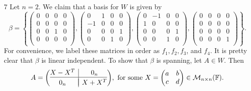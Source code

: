 \documentclass{article}
\makeatletter
\newenvironment{amatrix}[1]{%
  \left(\begin{array}{@{}*{#1}{c}|c@{}}
}{%
  \end{array}\right)
}
\theoremstyle{plain} %
\numberwithin{thm}{section} %
\theoremstyle{definition}
\makeatother
\begin{document}
\begin{question}{7}
        Let \(n = 2\). We claim that a basis for \(W\) is given by
        \[
            \beta = \left\{ \begin{pmatrix}
                0 & 0 & 0 &  0 \\
                0 & 0 & 0 &  0 \\
                0 & 0 & 1 &  0 \\
                0 & 0 & 0 &  0 \\
            \end{pmatrix},
            \begin{pmatrix}
                0 & 1 & 0 &  0 \\
                -1 & 0 & 0 &  0 \\
                0 & 0 & 0 &  1 \\
                0 & 0 & 1 &  0 \\
            \end{pmatrix},
            \begin{pmatrix}
                0 & -1 & 0 &  0 \\
                1 & 0 & 0 &  0 \\
                0 & 0 & 0 &  1 \\
                0 & 0 & 1 &  0 \\
            \end{pmatrix},
            \begin{pmatrix}
                0 & 0 & 0 &  0 \\
                0 & 0 & 0 &  0 \\
                0 & 0 & 0 &  0 \\
                0 & 0 & 0 &  1 \\
            \end{pmatrix}\right\}.
        \]
        For convenience, we label these matrices in order as \(f_1, f_2, f_3\), and \(f_4\). It is pretty clear that \(\beta\) is linear independent. To show that \(\beta\) is spanning, let \(A \in W\). Then
        \[
            A = \begin{amatrix}{1}
                X - X^T & 0_n \\
                \hline \\[-10pt]
                0_n & X + X^T
            \end{amatrix}, \text{ for some } X = \begin{pmatrix}
                a &  b \\
                c &  d \\
            \end{pmatrix} \in \mathcal{M} _{n\times n}(\mathbb{F}).
\]
\end{question}
\end{document}
